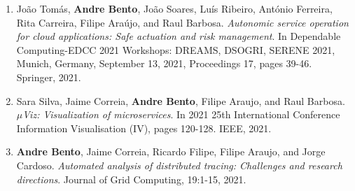 \documentclass[a4paper,9pt]{memoir}
\begin{document}
\begin{enumerate}[leftmargin=*]
	\item João Tomás, \textbf{Andre Bento}, João Soares, Luís Ribeiro, António Ferreira, Rita Carreira, Filipe Araújo, and Raul Barbosa. \emph{Autonomic service operation for cloud applications: Safe actuation and risk management}. In Dependable Computing-EDCC 2021 Workshops: DREAMS, DSOGRI, SERENE 2021, Munich, Germany, September 13, 2021, Proceedings 17, pages 39-46. Springer, 2021.%
	\item Sara Silva, Jaime Correia, \textbf{Andre Bento}, Filipe Araujo, and Raul Barbosa. \emph{$\mu$Viz: Visualization of microservices}. In 2021 25th 
	International Conference Information Visualisation (IV), pages 120-128. 
	IEEE, 2021.%
	\item \textbf{Andre Bento}, Jaime Correia, Ricardo Filipe, Filipe Araujo, and Jorge Cardoso. \emph{Automated analysis of distributed tracing: Challenges and research directions}. Journal of Grid Computing, 19:1-15, 2021.%
\end{enumerate}
\end{document}
